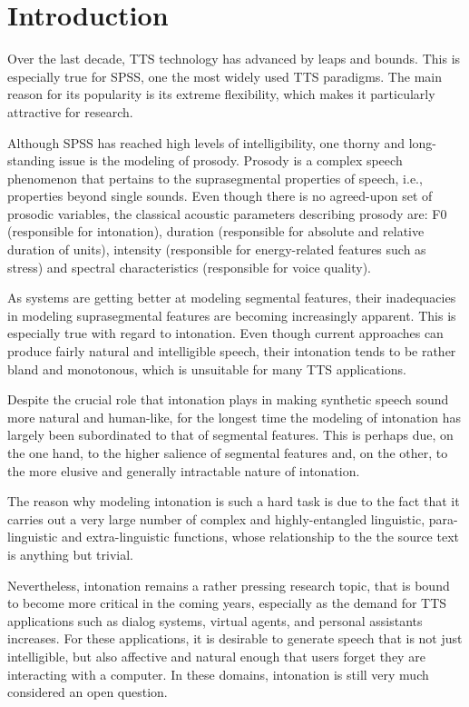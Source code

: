 

\chapter*{Introduction}\label{chap:introduction}

Over the last decade, \ac{TTS} technology has advanced by leaps and bounds. 
This is especially true for \ac{SPSS}, one the most widely used \ac{TTS} paradigms.
The main reason for its popularity is its extreme flexibility, which makes it particularly attractive for research.

Although \ac{SPSS} has reached high levels of intelligibility, one thorny and long-standing issue is the modeling of prosody.
Prosody is a complex speech phenomenon that pertains to the suprasegmental properties of speech, i.e., properties beyond single sounds.
Even though there is no agreed-upon set of prosodic variables, the classical acoustic parameters describing prosody are: \ac{F0} (responsible for intonation), duration (responsible for absolute and relative duration of units), intensity (responsible for energy-related features such as stress) and spectral characteristics (responsible for voice quality).

As systems are getting better at modeling segmental features, their inadequacies in modeling suprasegmental features are becoming increasingly apparent.
This is especially true with regard to intonation.
Even though current approaches can produce fairly natural and intelligible speech, their intonation tends to be rather bland and monotonous, which is unsuitable for many \ac{TTS} applications.

Despite the crucial role that intonation plays in making synthetic speech sound more natural and human-like, for the longest time the modeling of intonation has largely been subordinated to that of segmental features.
This is perhaps due, on the one hand, to the higher salience of segmental features and, on the other, to the more elusive and generally intractable nature of intonation.

The reason why modeling intonation is such a hard task is due to the fact that it carries out a very large number of complex and highly-entangled linguistic, para-linguistic and extra-linguistic functions, whose relationship to the the source text is anything but trivial.

Nevertheless, intonation remains a rather pressing research topic, that is bound to become more critical in the coming years, especially as the demand for \ac{TTS} applications such as dialog systems, virtual agents, and personal assistants increases. 
For these applications, it is desirable to generate speech that is not just intelligible, but also affective and natural enough that users forget they are interacting with a computer.
In these domains, intonation is still very much considered an open question.

